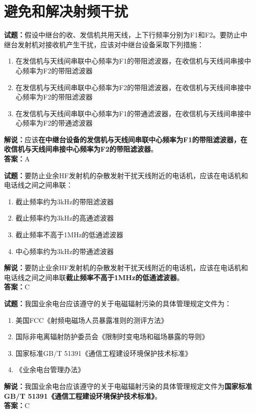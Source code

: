 \documentclass{ctexbook}
\begin{document}


\chapter{避免和解决射频干扰}

\newpage

\noindent\textbf{试题：}假设中继台的收、发信机共用天线，上下行频率分别为F1和F2。要防止中继台发射机对接收机产生干扰，应该对中继台设备采取下列措施：
\begin{enumerate}[leftmargin=3em]
  \item 在发信机与天线间串联中心频率为F1的带阻滤波器，在收信机与天线间串接中心频率为F2的带阻滤波器
  \item 在发信机与天线间串联中心频率为F2的带阻滤波器，在收信机与天线间串接中心频率为F2的带阻滤波器
  \item 在发信机与天线间串联中心频率为F1的带通滤波器，在收信机与天线间串接中心频率为F2的带通滤波器
\end{enumerate}
\noindent\textbf{解说：}应该\textbf{在中继台设备的发信机与天线间串联中心频率为F1的带阻滤波器，在收信机与天线间串接中心频率为F2的带阻滤波器}。\\\noindent\textbf{答案：}A

\bigskip

\noindent\textbf{试题：}要防止业余HF发射机的杂散发射干扰天线附近的电话机，应该在电话机和电话线之间之间串联：
\begin{enumerate}[leftmargin=3em]
  \item 截止频率约为3\si{\kHz}的带阻滤波器
  \item 截止频率约为3\si{\kHz}的高通滤波器
  \item 截止频率不高于1\si{\MHz}的低通滤波器
  \item 中心频率约为3\si{\kHz}的带通滤波器
\end{enumerate}
\noindent\textbf{解说：}要防止业余HF发射机的杂散发射干扰天线附近的电话机，应该在电话机和电话线之间之间串联\textbf{截止频率不高于1\si{\MHz}的低通滤波器}。\\\noindent
\textbf{答案：}C

\bigskip

\noindent\textbf{试题：}我国业余电台应该遵守的关于电磁辐射污染的具体管理规定文件为：
\begin{enumerate}[leftmargin=3em]
  \item 美国FCC《射频电磁场人员暴露准则的测评方法》
  \item 国际非电离辐射防护委员会《限制时变电场和磁场暴露的导则》
  \item 国家标准GB/T 51391《通信工程建设环境保护技术标准》
  \item 《业余电台管理办法》
\end{enumerate}
\noindent\textbf{解说：}我国业余电台应该遵守的关于电磁辐射污染的具体管理规定文件为\textbf{国家标准GB/T 51391《通信工程建设环境保护技术标准》}。\\\textbf{答案：}C
\end{document}
